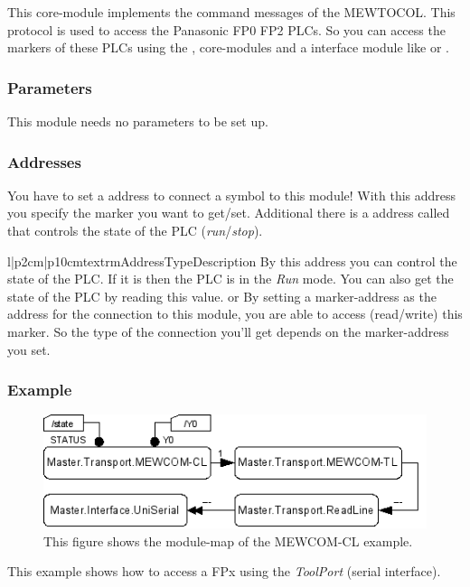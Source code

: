 %
%



%
%



%
%
This core-module implements the command messages of the MEWTOCOL. This 
protocol is used to access the Panasonic FP0 FP2 PLCs. So you can access
the markers of these PLCs using the ,
 core-modules and a interface module like 
 or .

\subsubsection{Parameters}
This module needs no parameters to be set up.

\subsubsection{Addresses}
You have to set a address to connect a symbol to this module! With this 
address you specify the marker you want to get/set. Additional there is a
address called  that controls the state of the PLC 
(\emph{run}/\emph{stop}).
\begin{tableiii}{l|p{2cm}|p{10cm}}{textrm}{Address}{Type}{Description}
        {}
        {By this address you can control the state of the PLC. If it is 
          then the PLC is in the \emph{Run} mode. You can also
         get the state of the PLC by reading this value.}
        { or
         }
        {By setting a marker-address as the address for the connection to this 
         module, you are able to access (read/write) this marker. So the type 
         of the connection you'll get depends on the marker-address you set.} 
\end{tableiii}

\subsubsection{Example}
\begin{figure}[ht]
    \label{fig:coremod11}
    \centering
    \includegraphics{coremod11.png}
    \caption{This figure shows the module-map of the MEWCOM-CL example.}
\end{figure}    
This example shows how to access a FPx using the \emph{ToolPort} (serial interface).

